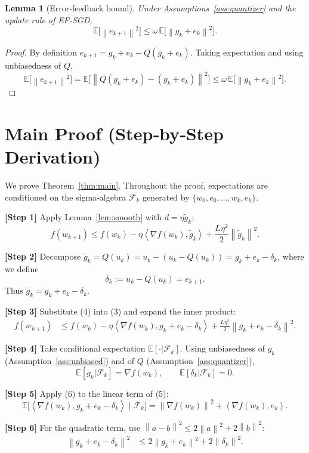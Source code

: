 \documentclass{article}
\newtheorem{lemma}{Lemma}
\newcommand{\E}{\mathbb{E}}
\newcommand{\norm}[1]{\left\lVert #1\right\rVert}
\newcommand{\ip}[2]{\left\langle #1,#2\right\rangle}
\begin{document}
\begin{lemma}[Error‑feedback bound]\label{lem:errorbound}
Under Assumptions~\ref{ass:quantizer} and the update rule of EF‑SGD,
\[
\E\!\bigl[\norm{e_{k+1}}^2\bigr]\le \omega\,\E\!\bigl[\norm{g_k+e_k}^2\bigr] .
\tag{2}
\]
\end{lemma}
\begin{proof}
By definition $e_{k+1}=g_k+e_k-Q(g_k+e_k)$. Taking expectation and using unbiasedness of $Q$,
\[
\E\!\bigl[\norm{e_{k+1}}^2\bigr]
= \E\!\bigl[\norm{Q(g_k+e_k)-(g_k+e_k)}^2\bigr]
\le \omega\,\E\!\bigl[\norm{g_k+e_k}^2\bigr] .
\]
\end{proof}

\section*{Main Proof (Step‑by‑Step Derivation)}
We prove Theorem~\ref{thm:main}.  Throughout the proof, expectations are conditioned on the sigma‑algebra
$\mathcal{F}_k$ generated by $\{w_0,e_0,\dots,w_k,e_k\}$.

\bigskip
\noindent\textbf{[Step 1]} Apply Lemma~\ref{lem:smooth} with $d=\eta\tilde g_k$:
\[
f(w_{k+1}) \le f(w_k)-\eta\ip{\nabla f(w_k)}{\tilde g_k}
+\frac{L\eta^2}{2}\norm{\tilde g_k}^2 .
\tag{3}
\]

\noindent\textbf{[Step 2]} Decompose $\tilde g_k=Q(u_k)=u_k-(u_k-Q(u_k))=g_k+e_k-\delta_k$, where we define
\[
\delta_k:=u_k-Q(u_k)=e_{k+1}.
\tag{4}
\]
Thus $\tilde g_k = g_k+e_k-\delta_k$.

\noindent\textbf{[Step 3]} Substitute (4) into (3) and expand the inner product:
\[
\begin{aligned}
f(w_{k+1}) &\le f(w_k)-\eta\ip{\nabla f(w_k)}{g_k+e_k-\delta_k}
+\frac{L\eta^2}{2}\norm{g_k+e_k-\delta_k}^2 .
\end{aligned}
\tag{5}
\]

\noindent\textbf{[Step 4]} Take conditional expectation $\E[\cdot|\mathcal{F}_k]$.
Using unbiasedness of $g_k$ (Assumption~\ref{ass:unbiased}) and of $Q$ (Assumption~\ref{ass:quantizer}),
\[
\E[g_k|\mathcal{F}_k]=\nabla f(w_k),\qquad
\E[\delta_k|\mathcal{F}_k]=0 .
\tag{6}
\]

\noindent\textbf{[Step 5]} Apply (6) to the linear term of (5):
\[
\E\!\bigl[\ip{\nabla f(w_k)}{g_k+e_k-\delta_k}\mid\mathcal{F}_k\bigr]
= \norm{\nabla f(w_k)}^2 + \ip{\nabla f(w_k)}{e_k}.
\tag{7}
\]

\noindent\textbf{[Step 6]} For the quadratic term, use $\norm{a-b}^2\le 2\norm{a}^2+2\norm{b}^2$:
\[
\begin{aligned}
\norm{g_k+e_k-\delta_k}^2
&\le 2\norm{g_k+e_k}^2+2\norm{\delta_k}^2 .
\end{aligned}
\tag{8}
\]
\end{document}
